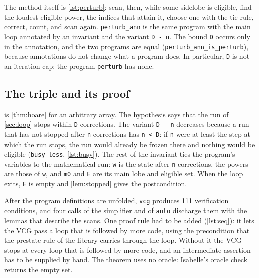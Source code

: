 \documentclass[11pt]{amsart}
\theoremstyle{plain}
\theoremstyle{definition}
\newcommand{\thy}[1]{\texttt{#1}}
\begin{document}


The method itself is \cref{lst:perturb}: scan, then, while some sidelobe is eligible, find the
loudest eligible power, the indices that attain it, choose one with the tie rule, correct, count, and
scan again.  \thy{perturb\_ann} is the same program with the main loop annotated by an invariant and
the variant \thy{D - n}.  The bound \thy{D} occurs only in the annotation, and the two programs are
equal (\thy{perturb\_ann\_is\_perturb}), because annotations do not change what a program does.  In
particular, \thy{D} is not an iteration cap: the program \thy{perturb} has none.




\subsection{The triple and its proof}

 is \cref{thm:hoare} for an arbitrary array.  The hypothesis says that the run
of \cref{sec:loop} stops within \thy{D} corrections.  The variant \thy{D - n} decreases because a run
that has not stopped after \thy{n} corrections has \thy{n < D}: if \thy{n} were at least the step at
which the run stops, the run would already be frozen there and nothing would be eligible
(\thy{busy\_less}, \cref{lst:busy}).  The rest of the invariant ties the program's variables to the
mathematical run: \thy{w} is the state after \thy{n} corrections, the powers are those of \thy{w},
and \thy{m0} and \thy{E} are its main lobe and eligible set.  When the loop exits, \thy{E} is empty
and \cref{lem:stopped} gives the postcondition.





After the program definitions are unfolded, \thy{vcg} produces 111 verification conditions, and four
calls of the simplifier and of \thy{auto} discharge them with the lemmas that describe the scans.  One
proof rule had to be added (\cref{lst:seq}): it lets the VCG pass a loop that is followed by more
code, using the precondition that the prestate rule of the library carries through the loop.
Without it the VCG stops at every loop that is followed by more code, and an intermediate assertion
has to be supplied by hand.  The
theorem uses no oracle: Isabelle's oracle check returns the empty set.
\end{document}
